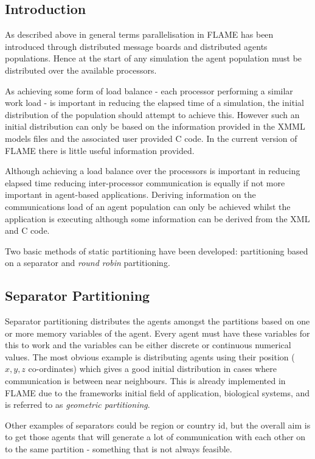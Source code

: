 \subsection{Introduction}

As described above in general terms parallelisation in FLAME has been introduced through distributed message boards and distributed agents populations. Hence at the start of any simulation the agent population must be distributed over the available processors.

As achieving some form of load balance - each processor performing a similar work load - is important in reducing the elapsed time of a simulation, the initial distribution of the population should attempt to achieve this. However such an initial distribution can only be based on the information provided in the XMML models files and the associated user provided C code. In the current version of FLAME there is little useful information provided.

Although achieving a load balance over the processors is important in reducing elapsed time reducing inter-processor communication is equally if not more important in agent-based applications. Deriving information on the communications load of an agent population can only be achieved whilst the application is executing although some information can be derived from the XML and C code.

Two basic methods of static partitioning have been developed: partitioning based on a separator and \textsl{round robin} partitioning.

\subsection{Separator Partitioning}

Separator partitioning distributes the agents amongst the partitions based on one or more memory variables of the agent. Every agent must have these variables for this to work and the variables can be either discrete or continuous numerical values. The most obvious example is distributing agents using their position ($x,y, z$ co-ordinates) which gives a good initial distribution in cases where communication is between near neighbours. This is already implemented in FLAME due to the frameworks initial field of application, biological systems, and is referred to as \textit{geometric partitioning}. 

Other examples of separators could be region or country id, but the overall aim is to get those agents that will generate a lot of communication with each other on to the same partition - something that is not always feasible.


